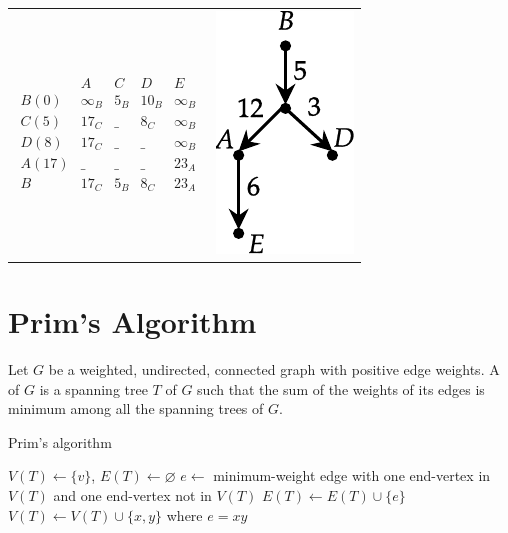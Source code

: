 \begin{Example}
\begin{center}
\begin{tabular}{cc}
	\begin{minipage}{5cm}
	$\begin{array}{r|cccc}
	 	 &		A	&	C	&	D	&	E\\
	\hline
	B(0) &	\infty_B	&	\boxed{5_B}	&	10_B	&	\infty_B\\
	C(5) &	17_C	&	\_	&	\boxed{8_C}	&	\infty_B\\
	D(8) &	\boxed{17_C}	&	\_	&	\_	&	\infty_B\\
	A(17)&	\_	&	\_	&	\_	&	23_A\\
	\hline
	B	&	17_C	&	5_B	&	8_C	&	23_A
	\end{array}$
	\end{minipage}
&
	\begin{minipage}{5cm}
		\centering
	\includegraphics[scale=0.7]{Images/ShortestPaths.pdf}
	\end{minipage}

\end{tabular}
\end{center}

\end{Example}

\section{Prim's Algorithm}\label{sec:Prim}

Let $G$ be a weighted, undirected, connected graph with positive edge weights. A  of $G$ is a spanning tree $T$ of $G$ such that the sum of the weights of its edges is minimum among all the spanning trees of $G$.

\begin{algorithm}\caption{Prim's algorithm}\label{alg:Prim}
\begin{algorithmic}[1]
	\State $V(T) \gets \{v\}$, $E(T) \gets \varnothing$
        \State $e \gets$ minimum-weight edge with one end-vertex in $V(T)$ and one end-vertex not in $V(T)$
        \State $E(T) \gets E(T) \cup \{e\}$
        \State $V(T) \gets V(T) \cup \{x, y\}$ where $e = xy$
	\EndWhile
\end{algorithmic}
\end{algorithm}

